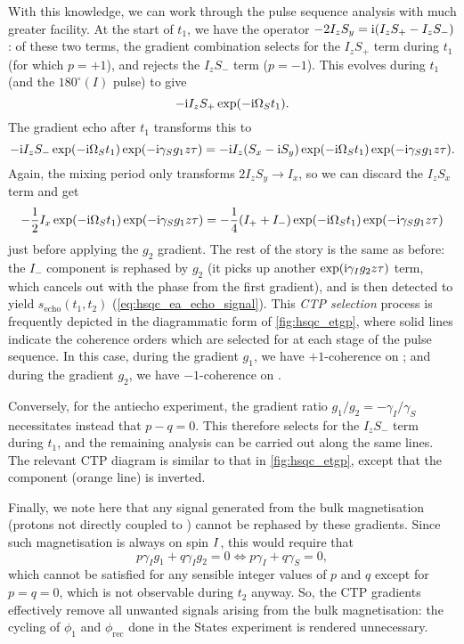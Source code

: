 With this knowledge, we can work through the pulse sequence analysis with much greater facility.
At the start of $t_1$, we have the operator $-2I_zS_y = \mathrm{i}(I_zS_+ - I_zS_-)$: of these two terms, the gradient combination selects for the $I_zS_+$ term during $t_1$ (for which $p = +1$), and rejects the $I_zS_-$ term ($p = -1$).
This evolves during $t_1$ (and the $180^\circ(I)$ pulse) to give
\begin{equation}
    \label{eq:hsqc_echo_shift_aftert1}
    -\mathrm{i} I_zS_+ \exp(-\mathrm{i} \Omega_S t_1).
\end{equation}
The gradient echo after $t_1$ transforms this to
\begin{equation}
    \label{eq:hsqc_echo_shift_after_g1}
    -\mathrm{i} I_zS_- \exp(-\mathrm{i} \Omega_S t_1)\exp(-\mathrm{i} \gamma_S g_1 z\tau) = -\mathrm{i} I_z(S_x - \mathrm{i} S_y) \exp(-\mathrm{i} \Omega_S t_1)\exp(-\mathrm{i} \gamma_S g_1 z\tau).
\end{equation}
Again, the mixing period only transforms $2I_zS_y \to I_x$, so we can discard the $I_zS_x$ term and get
\begin{equation}
    \label{eq:hsqc_echo_shift_before_g2}
    -\frac{1}{2} I_x \exp(-\mathrm{i} \Omega_S t_1)\exp(-\mathrm{i} \gamma_S g_1 z\tau)
    = -\frac{1}{4}(I_+ + I_-)\exp(-\mathrm{i} \Omega_S t_1)\exp(-\mathrm{i} \gamma_S g_1 z\tau)
\end{equation}
just before applying the $g_2$ gradient.
The rest of the story is the same as before: the $I_-$ component is rephased by $g_2$ (it picks up another $\exp(\mathrm{i}\gamma_Ig_2 z\tau)$ term, which cancels out with the phase from the first gradient), and is then detected to yield $s_\text{echo}(t_1, t_2)$ (\cref{eq:hsqc_ea_echo_signal}).
This \textit{CTP selection} process is frequently depicted in the diagrammatic form of \cref{fig:hsqc_etgp}, where solid lines indicate the coherence orders which are selected for at each stage of the pulse sequence.
In this case, during the gradient $g_1$, we have $+1$-coherence on \carbon{}; and during the gradient $g_2$, we have $-1$-coherence on \proton{}.

Conversely, for the antiecho experiment, the gradient ratio $g_1/g_2 = -\gamma_I/\gamma_S$ necessitates instead that $p - q = 0$.
This therefore selects for the $I_zS_-$ term during $t_1$, and the remaining analysis can be carried out along the same lines.
The relevant CTP diagram is similar to that in \cref{fig:hsqc_etgp}, except that the \carbon{} component (orange line) is inverted.

Finally, we note here that any signal generated from the bulk magnetisation (protons not directly coupled to \carbon{}) cannot be rephased by these gradients.
Since such magnetisation is always on spin $I\/$, this would require that
\begin{equation}
    \label{eq:unrefocusable_bulk}
    p\gamma_I g_1 + q\gamma_I g_2 = 0 \Leftrightarrow p \gamma_I + q\gamma_S = 0,
\end{equation}
which cannot be satisfied for any sensible integer values of $p$ and $q$ except for $p = q = 0$, which is not observable during $t_2$ anyway.
So, the CTP gradients effectively remove all unwanted signals arising from the bulk magnetisation: the cycling of $\phi_1$ and $\phi_\text{rec}$ done in the States experiment is rendered unnecessary.

